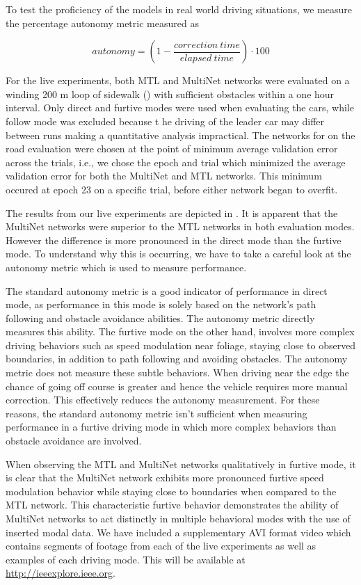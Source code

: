 To test the proficiency of the models in real world driving situations, we measure the percentage autonomy metric \cite{bojarski2016end} measured as

\begin{equation}
    autonomy = (1 - \dfrac{correction\ time}{elapsed\ time}) \cdot 100
   \label{eq:autonomy}
\end{equation}

For the live experiments, both MTL and MultiNet networks were evaluated on a winding 200 m loop of sidewalk () with sufficient obstacles within a one hour interval. Only direct and furtive modes were used when evaluating the cars, while follow mode was excluded because t he driving of the leader car may differ between runs making a quantitative analysis impractical. The networks for on the road evaluation were chosen at the point of minimum average validation error across the trials, i.e., we chose the epoch and trial which minimized the average validation error for both the MultiNet and MTL networks. This minimum occured at epoch 23 on a specific trial, before either network began to overfit. 


The results from our live experiments are depicted in . It is apparent that the MultiNet networks were superior to the MTL networks in both evaluation modes. However the difference is more pronounced in the direct mode than the furtive mode. To understand why this is occurring, we have to take a careful look at the autonomy metric which is used to measure performance.

The standard autonomy metric is a good indicator of performance in direct mode, as performance in this mode is solely based on the network's path following and obstacle avoidance abilities. The autonomy metric directly measures this ability.
The furtive mode on the other hand, involves more complex driving behaviors such as speed modulation near foliage, staying close to observed boundaries, in addition to path following and avoiding obstacles. The autonomy metric does not measure these subtle behaviors.
When driving near the edge the chance of going off course is greater and hence the vehicle requires more manual correction. This effectively reduces the autonomy measurement. For these reasons, the standard autonomy metric isn't sufficient when measuring performance in a furtive driving mode in which more complex behaviors than obstacle avoidance are involved.

When observing the MTL and MultiNet networks qualitatively in furtive mode, it is clear that the MultiNet network exhibits more pronounced furtive speed modulation behavior while staying close to boundaries when compared to the MTL network. This characteristic furtive behavior demonstrates the ability of MultiNet networks to act distinctly in multiple behavioral modes with the use of inserted modal data. We have included a supplementary AVI format video which contains segments of footage from each of the live experiments as well as examples of each driving mode. This will be available at \url{http://ieeexplore.ieee.org}.

